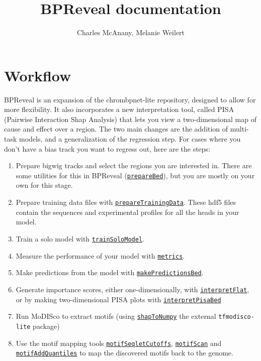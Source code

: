 \documentclass{article}
\title{BPReveal documentation}
\author{Charles McAnany, Melanie Weilert}
\begin{document}
\newcommand{\deprecation}[1]{\colorbox{orange}{#1}}
\newcommand{\progref}[1]{\hyperref[prog:#1]{\texttt{#1}}}
\maketitle

\tableofcontents

\newpage

\section{Workflow}

BPReveal is an expansion of the chrombpnet-lite repository, designed to allow for more flexibility.
It also incorporates a new interpretation tool, called PISA (Pairwise Interaction Shap Analysis)
that lets you view a two-dimensional map of cause and effect over a region.
The two main changes are the addition of multi-task models, and a generalization of the regression
step.
For cases where you don't have a bias track you want to regress out, here are the steps:

\begin{enumerate}
    \item Prepare bigwig tracks and select the regions you are interested in. There are some
        utilities for this in BPReveal (\progref{prepareBed}), but you are mostly on your own for this stage.
    \item Prepare training data files with \progref{prepareTrainingData}. These hdf5 files contain
        the sequences and experimental profiles for all the heads in your model.
    \item Train a solo model with \progref{trainSoloModel}.
    \item Measure the performance of your model with \progref{metrics}.
    \item Make predictions from the model with \progref{makePredictionsBed}.
    \item Generate importance scores, either one-dimensionally, with \progref{interpretFlat}, or by
        making two-dimensional PISA plots with \progref{interpretPisaBed}
    \item Run MoDISco to extract motifs (using \progref{shapToNumpy} the external \texttt{tfmodisco-lite} package)
    \item Use the motif mapping tools \progref{motifSeqletCutoffs}, \progref{motifScan} and
        \progref{motifAddQuantiles} to map the discovered motifs back to the genome.
\end{enumerate}
\end{document}

